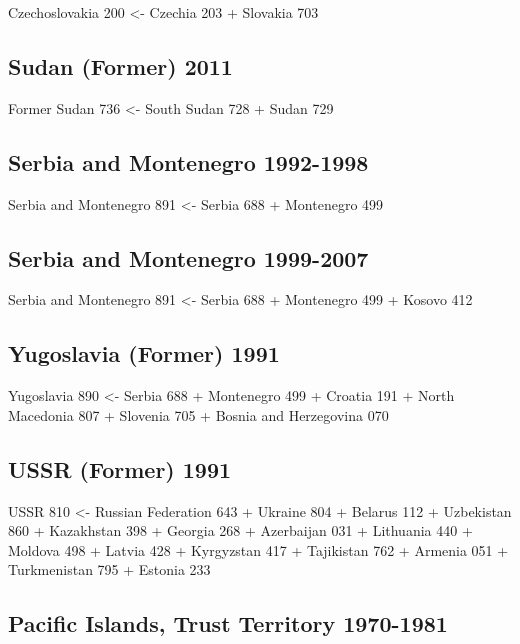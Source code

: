 \documentclass[
]{book}
\begin{document}
Czechoslovakia 200 \textless- Czechia 203 + Slovakia 703

\subsection*{Sudan (Former) 2011}\label{sudan-former-2011}

Former Sudan 736 \textless- South Sudan 728 + Sudan 729

\subsection*{Serbia and Montenegro 1992-1998}\label{serbia-and-montenegro-1992-1998}

Serbia and Montenegro 891 \textless- Serbia 688 + Montenegro 499

\subsection*{Serbia and Montenegro 1999-2007}\label{serbia-and-montenegro-1999-2007}

Serbia and Montenegro 891 \textless- Serbia 688 + Montenegro 499 + Kosovo 412

\subsection*{Yugoslavia (Former) 1991}\label{yugoslavia-former-1991}

Yugoslavia 890 \textless- Serbia 688 + Montenegro 499 + Croatia 191 + North Macedonia 807
+ Slovenia 705 + Bosnia and Herzegovina 070

\subsection*{USSR (Former) 1991}\label{ussr-former-1991}

USSR 810 \textless- Russian Federation 643 + Ukraine 804 + Belarus 112 + Uzbekistan 860 + Kazakhstan 398
+ Georgia 268 + Azerbaijan 031 + Lithuania 440 + Moldova 498 + Latvia 428 + Kyrgyzstan 417
+ Tajikistan 762 + Armenia 051 + Turkmenistan 795 + Estonia 233

\subsection*{Pacific Islands, Trust Territory 1970-1981}\label{pacific-islands-trust-territory-1970-1981}
\end{document}
